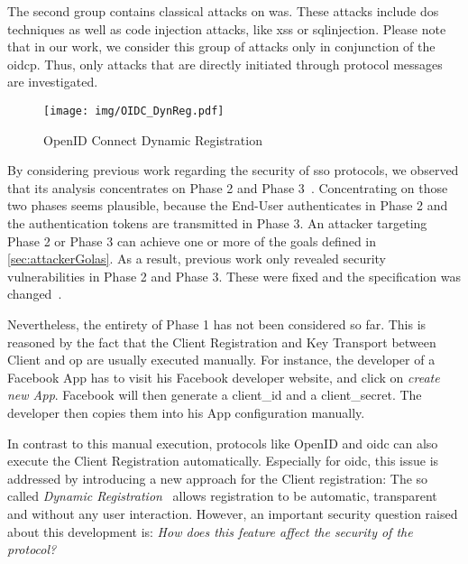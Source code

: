 \documentclass[conference,compsoc]{IEEEtran}
\begin{document}
The second group contains classical attacks on \glspl{wa}. These attacks include \gls{dos} techniques as well as code injection attacks, like \gls{xss} or \gls{sqlinjection}.
Please note that in our work, we consider this group of attacks only in conjunction of the \gls{oidcp}. Thus, only attacks that are directly initiated through protocol messages are investigated.
\label{sec:novelAnanalyzingTechniques}
\begin{figure*}[t]
	\centering
	\texttt{[image: img/OIDC\_DynReg.pdf]}
\caption{OpenID Connect Dynamic Registration}
	\label{fig:OIDC_DynReg}
\end{figure*}

By considering previous work regarding the security of \gls{sso} protocols, we observed that its analysis concentrates on Phase 2 and Phase 3~\cite{sun2012devil,ssoscan,demystifiedOAuthCCS14}.
Concentrating on those two phases seems plausible, because the End-User authenticates in Phase 2 and the authentication tokens are transmitted in Phase 3.
An attacker targeting Phase 2 or Phase 3 can achieve one or more of the goals defined in \autoref{sec:attackerGolas}.
As a result, previous work only revealed security vulnerabilities in Phase 2 and Phase 3. These were fixed and the specification was changed~\cite{demystifiedOAuthCCS14}.

Nevertheless, the entirety of Phase 1 has not been considered so far. 
This is reasoned by the fact that the Client Registration and Key Transport between Client and \gls{op} are usually executed manually.
For instance, the developer of a Facebook App has to visit his Facebook developer website, and click on \emph{create new App}.
Facebook will then generate a \gls{client_id} and a \gls{client_secret}.
The developer then copies them into his App configuration manually.

In contrast to this manual execution, protocols like OpenID and \gls{oidc} can also execute the Client Registration automatically.
Especially for \gls{oidc}, this issue is addressed by introducing a new approach for the Client registration:
The so called \emph{Dynamic Registration}~\cite{OpenIDFoundation2014b} allows registration to be automatic, transparent and without any user interaction.
However, an important security question raised about this development is:
\emph{How does this feature affect the security of the protocol?}
\end{document}
